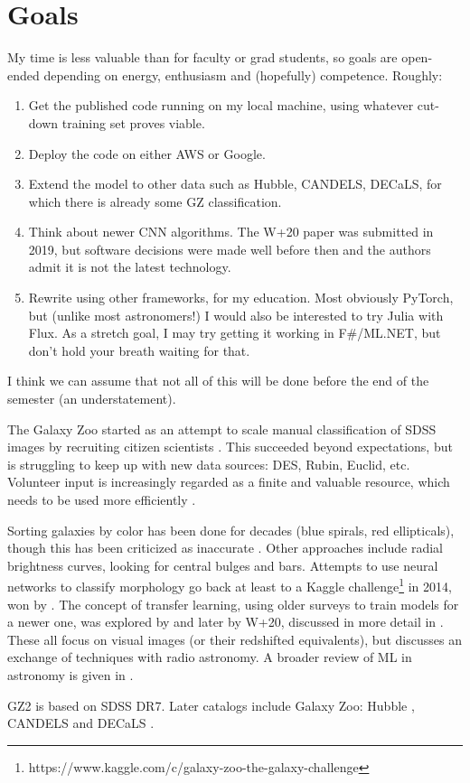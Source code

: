 \documentclass[twocolumn, twocolappendix, tighten]{aastex63}
\begin{document}
\section{Goals}

My time is less valuable than for faculty or grad students, so goals are open-ended depending on energy, enthusiasm and (hopefully) competence. Roughly:
\begin{enumerate}
	\item Get the published code running on my local machine, using whatever cut-down training set proves viable.
	\item Deploy the code on either AWS or Google.
	\item Extend the model to other data such as Hubble, CANDELS, DECaLS, for which there is already some GZ classification.
	\item Think about newer CNN algorithms. The W+20 paper was submitted in 2019, but software decisions were made well before then and the authors admit it is not the latest technology.
	\item Rewrite using other frameworks, for my education. Most obviously PyTorch, but (unlike most astronomers!) I would also be interested to try Julia with Flux. As a stretch goal, I may try getting it working in F\#/ML.NET, but don't hold your breath waiting for that.
\end{enumerate}

I think we can assume that not all of this will be done before the end of the semester (an understatement).

\appendix


The Galaxy Zoo started as an attempt to scale manual classification of SDSS images by recruiting citizen scientists \citep{2008MNRAS.389.1179L}. This succeeded beyond expectations, but is struggling to keep up with new data sources: DES, Rubin, Euclid, etc. Volunteer input is increasingly regarded as a finite and valuable resource, which needs to be used more efficiently \citep{2020IAUS..341...99D}.

Sorting galaxies by color has been done for decades (blue spirals, red ellipticals), though this has been criticized as inaccurate \citep{smethurst_quantifying_2022}. Other approaches include radial brightness curves, looking for central bulges and bars. Attempts to use neural networks to classify morphology go back at least to a Kaggle challenge\footnote{https://www.kaggle.com/c/galaxy-zoo-the-galaxy-challenge} in 2014, won by \citet{2015MNRAS.450.1441D}. The concept of transfer learning, using older surveys to train models for a newer one, was explored by \citet{2019MNRAS.484...93D} and later by W+20, discussed in more detail in \citet{2021arXiv211012735W}. These all focus on visual images (or their redshifted equivalents), but \citet{2021arXiv211104353F} discusses an exchange of techniques with radio astronomy. A broader review of ML in astronomy is given in \citet{2020WDMKD..10.1349F}.

GZ2 \citep{willett_galaxy_2013, 2016MNRAS.461.3663H} is based on SDSS DR7. Later catalogs include Galaxy Zoo: Hubble \citep{2017MNRAS.464.4176W}, CANDELS \citep{2017MNRAS.464.4420S} and DECaLS \citep{walmsley_galaxy_2022}.



{}

\end{document}
